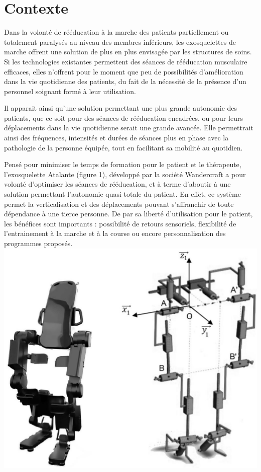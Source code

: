 \documentclass[10pt]{article}
\begin{document}
\section{Contexte}
Dans la volonté de rééducation à la marche des patients partiellement ou totalement paralysés au niveau des membres inférieurs, les exosquelettes de marche offrent une solution de plus en plus envisagée par les structures de soins. Si les technologies existantes permettent des séances de rééducation musculaire efficaces, elles n'offrent pour le moment que peu de possibilités d'amélioration dans la vie quotidienne des patients, du fait de la nécessité de la présence d'un personnel soignant formé à leur utilisation.

Il apparait ainsi qu'une solution permettant une plus grande autonomie des patients, que ce soit pour des séances de rééducation encadrées, ou pour leurs déplacements dans la vie quotidienne serait une grande avancée. Elle permettrait ainsi des fréquences, intensités et durées de séances plus en phase avec la pathologie de la personne équipée, tout en facilitant sa mobilité au quotidien.

Pensé pour minimiser le temps de formation pour le patient et le thérapeute, l'exosquelette Atalante (figure 1), développé par la société Wandercraft a pour volonté d'optimiser les séances de rééducation, et à terme d'aboutir à une solution permettant l'autonomie quasi totale du patient. En effet, ce système permet la verticalisation et des déplacements pouvant s'affranchir de toute dépendance à une tierce personne. De par sa liberté d'utilisation pour le patient, les bénéfices sont importants : possibilité de retours sensoriels, flexibilité de l'entrainement à la marche et à la course ou encore personnalisation des programmes proposés.
\includegraphics[max width=\textwidth, center]{2023_05_12_54c6a64d2ffce28d5c72g-01(1)}
\end{document}
